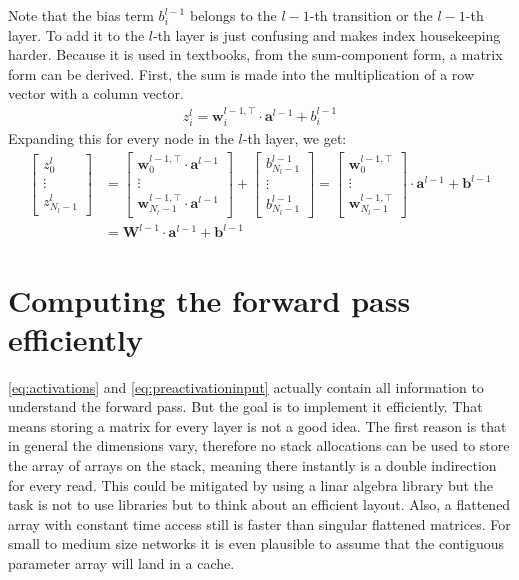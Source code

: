 Note that the bias term $b_i^{l-1}$ belongs to the $l-1$-th transition or the $l-1$-th layer. To add it to the $l$-th layer  is just confusing and makes index housekeeping harder.
Because it is used in textbooks, from the sum-component form, a matrix form can be derived. First, the sum is made into the multiplication of a row vector with a column vector.
\begin{align}
	\label{eq:vectorproduct1}
	z_i^{l}=\boldsymbol{w}_i^{l-1,\top}\cdot \boldsymbol{a}^{l-1}+b_i^{l-1}
\end{align}
Expanding this for every node in the $l$-th layer, we get:
\begin{align}
	\begin{bmatrix}z_0^{l}\\\vdots\\z_{N_l-1}^{l}\end{bmatrix}&=\begin{bmatrix}\boldsymbol{w}_0^{l-1,\top}\cdot \boldsymbol{a}^{l-1}\\\vdots\\\boldsymbol{w}_{N_l-1}^{l-1,\top}\cdot \boldsymbol{a}^{l-1}\end{bmatrix}+\begin{bmatrix}b_{N_l-1}^{l-1}\\\vdots\\ b_{N_l-1}^{l-1}\end{bmatrix}=\begin{bmatrix}\boldsymbol{w}_0^{l-1,\top}\\\vdots\\\boldsymbol{w}_{N_l-1}^{l-1,\top}\end{bmatrix} \cdot\boldsymbol{a}^{l-1}+\boldsymbol{b}^{l-1}\\&=\boldsymbol{W}^{l-1} \cdot\boldsymbol{a}^{l-1}+\boldsymbol{b}^{l-1}
\end{align}
\section{Computing the forward pass efficiently}
\eqref{eq:activations} and \eqref{eq:preactivationinput} actually contain all information to understand the forward pass. But the goal is to implement it efficiently. That means storing a matrix for every layer is not a good idea. The first reason is that in general the dimensions vary, therefore no stack allocations can be used to store the array of arrays on the stack, meaning there instantly is a double indirection for every read. This could be mitigated by using a linar algebra library but the task is not to use libraries but to think about an efficient layout. Also, a flattened array with constant time access still is faster than singular flattened matrices. For small to medium size networks it is even plausible to assume that the contiguous parameter array will land in a cache.
